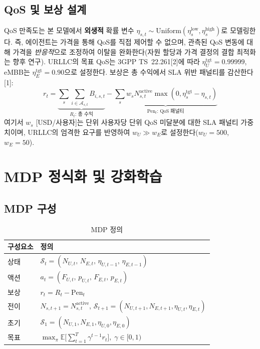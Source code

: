 \documentclass[10pt, twocolumn]{article}
\begin{document}
\subsection{QoS 및 보상 설계}

QoS 만족도는 본 모델에서 \textbf{외생적} 확률 변수 $\eta_{s,t} \sim \text{Uniform}(\eta_s^{\text{low}}, \eta_s^{\text{high}})$로 모델링한다. 즉, 에이전트는 가격을 통해 QoS를 직접 제어할 수 없으며, 관측된 QoS 변동에 대해 가격을 \emph{반응적}으로 조정하여 이탈을 완화한다(자원 할당과 가격 결정의 결합 최적화는 향후 연구).
URLLC의 목표 QoS는 3GPP TS~22.261[2]에 따라 $\eta_U^{\text{tgt}} = 0.99999$, eMBB는 $\eta_E^{\text{tgt}} = 0.90$으로 설정한다.
보상은 총 수익에서 SLA 위반 패널티를 감산한다[1]:
\begin{equation}
  r_t = \underbrace{\sum_{s} \sum_{i \in \mathcal{A}_{s,t}} B_{i,s,t}}_{R_t\text{: 총 수익}} - \underbrace{\sum_{s} w_s N_{s,t}^{\text{active}} \max(0, \eta_s^{\text{tgt}} - \eta_{s,t})}_{\text{Pen}_t\text{: QoS 패널티}}
  \label{eq:reward}
\end{equation}
여기서 $w_s$ [USD/사용자]는 단위 사용자당 단위 QoS 미달분에 대한 SLA 패널티 가중치이며, URLLC의 엄격한 요구를 반영하여 $w_U \gg w_E$로 설정한다($w_U = 500$, $w_E = 50$).

\section{MDP 정식화 및 강화학습}

\subsection{MDP 구성}

\begin{table}[h]
\centering
\caption{MDP 정의}
\label{tab:mdp}
\small
\begin{tabular}{@{}ll@{}}
\toprule
구성요소 & 정의 \\
\midrule
상태 & $\mathcal{S}_t = (N_{U,t},\, N_{E,t},\, \eta_{U,t-1},\, \eta_{E,t-1})$ \\
액션 & $a_t = (F_{U,t},\, p_{U,t},\, F_{E,t},\, p_{E,t})$ \\
보상 & $r_t = R_t - \text{Pen}_t$ \\
전이 & $N_{s,t+1} = N_{s,t}^{\text{active}}$, $\mathcal{S}_{t+1} = (N_{U,t+1}, N_{E,t+1}, \eta_{U,t}, \eta_{E,t})$ \\
초기 & $\mathcal{S}_1 = (N_{U,1}, N_{E,1}, \eta_{U,0}, \eta_{E,0})$ \\
목표 & $\max_\pi \mathbb{E}\!\big[\sum_{t=1}^{T} \gamma^{t-1} r_t\big],\; \gamma \in [0,1)$ \\
\bottomrule
\end{tabular}
\end{table}
\end{document}
